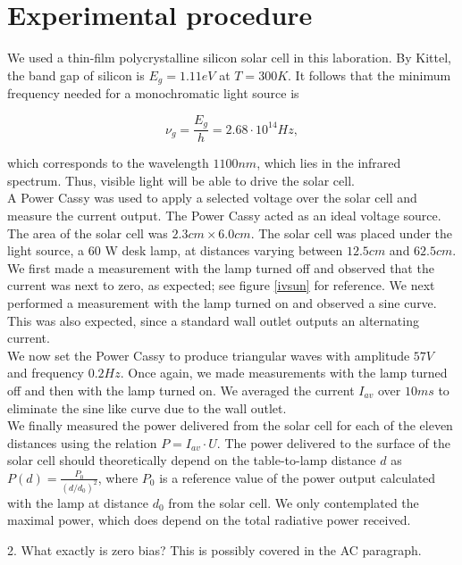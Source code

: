 \documentclass[a4paper]{article}
\begin{document}
\section{Experimental procedure}

We used a thin-film polycrystalline silicon solar cell in this laboration. By Kittel, the band gap of silicon is $E_g = 1.11 eV$ at $T = 300 K$. It follows that the minimum frequency needed for a monochromatic light source is

$$\nu_g = \frac{E_g}{h} = 2.68 \cdot 10^{14} Hz,$$

which corresponds to the wavelength $1100 nm$, which lies in the infrared spectrum. Thus, visible light will be able to drive the solar cell. \\

A Power Cassy was used to apply a selected voltage over the solar cell and measure the current output. The Power Cassy acted as an ideal voltage source. The area of the solar cell was $2.3 cm \times 6.0 cm$. The solar cell was placed under the light source, a $60$ W desk lamp, at distances varying between $12.5 cm$ and $62.5 cm$. \\

We first made a measurement with the lamp turned off and observed that the current was next to zero, as expected; see figure \ref{ivsun} for reference. We next performed a measurement with the lamp turned on and observed a sine curve. This was also expected, since a standard wall outlet outputs an alternating current. \\

We now set the Power Cassy to produce triangular waves with amplitude $57 V$ and frequency $0.2 Hz$. Once again, we made measurements with the lamp turned off and then with the lamp turned on. We averaged the current $I_{av}$ over $10 ms$ to eliminate the sine like curve due to the wall outlet. \\

We finally measured the power delivered from the solar cell for each of the eleven distances using the relation $P = I_{av} \cdot U$. The power delivered to the surface of the solar cell should theoretically depend on the table-to-lamp distance $d$ as $P(d) = \frac{P_0}{(d/d_0)^2}$, where $P_0$ is a reference value of the power output calculated with the lamp at distance $d_0$ from the solar cell. We only contemplated the maximal power, which does depend on the total radiative power received.

2. What exactly is zero bias? This is possibly covered in the AC paragraph.
\end{document}
